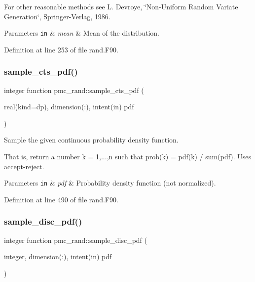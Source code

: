 For other reasonable methods see L. Devroye, \char`\"{}\+Non-\/\+Uniform Random
 Variate Generation\char`\"{}, Springer-\/\+Verlag, 1986.


\begin{DoxyParams}[1]{Parameters}
\mbox{\tt in}  & {\em mean} & Mean of the distribution. \\
\hline
\end{DoxyParams}


Definition at line 253 of file rand.\+F90.

\mbox{\label{namespacepmc__rand_a69a67c16e1e0a2ea9946e307775237e8}} 
\subsubsection{\texorpdfstring{sample\+\_\+cts\+\_\+pdf()}{sample\_cts\_pdf()}}
{\footnotesize\ttfamily integer function pmc\+\_\+rand\+::sample\+\_\+cts\+\_\+pdf (\begin{DoxyParamCaption}\item[{real(kind=dp), dimension(\+:), intent(in)}]{pdf }\end{DoxyParamCaption})}



Sample the given continuous probability density function. 

That is, return a number k = 1,...,n such that prob(k) = pdf(k) / sum(pdf). Uses accept-\/reject.


\begin{DoxyParams}[1]{Parameters}
\mbox{\tt in}  & {\em pdf} & Probability density function (not normalized). \\
\hline
\end{DoxyParams}


Definition at line 490 of file rand.\+F90.

\mbox{\label{namespacepmc__rand_a38a356c6ac89e03417f24d20f31e7d6e}} 
\subsubsection{\texorpdfstring{sample\+\_\+disc\+\_\+pdf()}{sample\_disc\_pdf()}}
{\footnotesize\ttfamily integer function pmc\+\_\+rand\+::sample\+\_\+disc\+\_\+pdf (\begin{DoxyParamCaption}\item[{integer, dimension(\+:), intent(in)}]{pdf }\end{DoxyParamCaption})}



